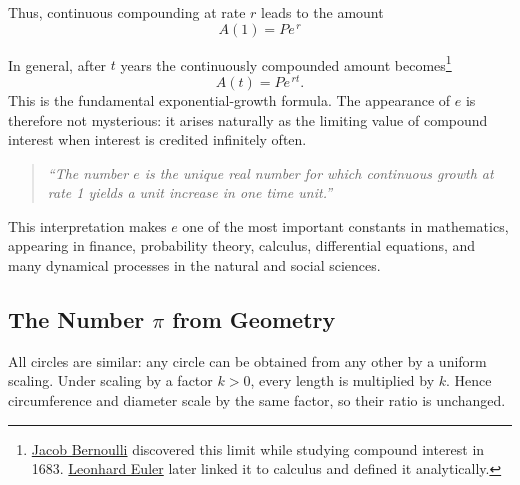 \vspace{0.25in}
Thus, continuous compounding at rate $r$ leads to the amount
\[
A(1)=Pe^{\,r}
\]

\noindent
In general, after $t$ years the continuously compounded amount becomes\footnote{\href{https://en.wikipedia.org/wiki/Jacob_Bernoulli}{Jacob Bernoulli} discovered this limit while studying compound interest in 1683. \href{https://en.wikipedia.org/wiki/Leonhard_Euler}{Leonhard Euler} later linked it to calculus and defined it analytically.}
\[
A(t)=Pe^{\,rt}.
\]
This is the fundamental exponential-growth formula.  The appearance of
$e$ is therefore not mysterious: it arises naturally as the limiting
value of compound interest when interest is credited infinitely often.

\begin{quote}
\emph{``The number $e$ is the unique real number for which continuous
growth at rate 1 yields a unit increase in one time unit.''}
\end{quote}

This interpretation makes $e$ one of the most important constants in
mathematics, appearing in finance, probability theory, calculus,
differential equations, and many dynamical processes in the natural and
social sciences.

\subsection{The Number $\pi$ from Geometry}

All circles are similar: any circle can be obtained from any other by a
uniform scaling.  Under scaling by a factor $k>0$, every length is multiplied
by $k$.  Hence circumference and diameter scale by the same factor, so their
ratio is unchanged.

